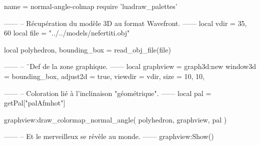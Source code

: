 \documentclass{standalone}
\begin{document}
\begin{luadraw}{name = normal-angle-colmap}
require 'luadraw_palettes'

------
-- Récupération du modèle 3D au format Wavefront.
------
local vdir = {35, 60}
local file = "../../models/nefertiti.obj"

local polyhedron, bounding_box = read_obj_file(file)


------
-- ¨Def de la zone graphique.
------
local graphview = graph3d:new{
  window3d = bounding_box,
  adjust2d = true,
  viewdir  = vdir,
  size     = {10, 10},
}

------
-- Coloration lié à l'inclinaison "géométrique".
------
local pal = getPal["palAfmhot"]

graphview:draw_colormap_normal_angle(
  polyhedron,
  graphview,
  pal
)

------
-- Et le merveilleux se révèle au monde.
------
graphview:Show()
\end{luadraw}
\end{document}
